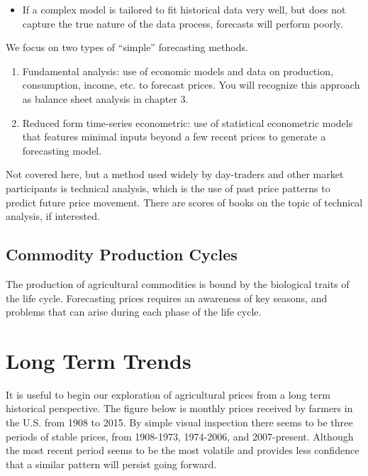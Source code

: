 \documentclass[]{book}
\providecommand{\tightlist}{%
  \setlength{\itemsep}{0pt}\setlength{\parskip}{0pt}}
\theoremstyle{definition}
\theoremstyle{definition}
\theoremstyle{remark}
\begin{document}
\begin{enumerate}
\begin{itemize}
    \begin{itemize}
    \tightlist
    \item
      If a complex model is tailored to fit historical data very well,
      but does not capture the true nature of the data process,
      forecasts will perform poorly.
    \end{itemize}
  \end{itemize}
\end{enumerate}

We focus on two types of ``simple'' forecasting methods.

\begin{enumerate}
\def\labelenumi{\arabic{enumi}.}
\item
  Fundamental analysis: use of economic models and data on production,
  consumption, income, etc. to forecast prices. You will recognize this
  approach as balance sheet analysis in chapter 3.
\item
  Reduced form time-series econometric: use of statistical econometric
  models that features minimal inputs beyond a few recent prices to
  generate a forecasting model.
\end{enumerate}

Not covered here, but a method used widely by day-traders and other
market participants is technical analysis, which is the use of past
price patterns to predict future price movement. There are scores of
books on the topic of technical analysis, if interested.

\subsection{Commodity Production
Cycles}\label{commodity-production-cycles}

The production of agricultural commodities is bound by the biological
traits of the life cycle. Forecasting prices requires an awareness of
key seasons, and problems that can arise during each phase of the life
cycle.

\section{Long Term Trends}\label{long-term-trends}

It is useful to begin our exploration of agricultural prices from a long
term historical perspective. The figure below is monthly prices received
by farmers in the U.S. from 1908 to 2015. By simple visual inspection
there seems to be three periods of stable prices, from 1908-1973,
1974-2006, and 2007-present. Although the most recent period seems to be
the most volatile and provides less confidence that a similar pattern
will persist going forward.
\end{document}

